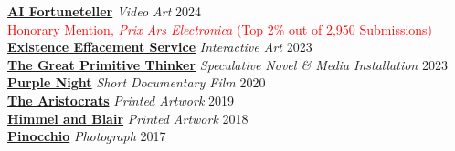 \textbf{\href{https://www.youtube.com/watch?v=Y21DGAZQWMU}{AI Fortuneteller}} \textit{Video Art} \hfill{2024}\\
\textcolor{red}{Honorary Mention, \textit{Prix Ars Electronica} (Top 2\% out of 2,950 Submissions)} \\
\textbf{\href{https://www.kwonsoonho.com/project/existenceeffacement}{Existence Effacement Service}} \textit{Interactive Art} \hfill{2023}\\
\textbf{\href{https://www.kwonsoonho.com/project/thegpt}{The Great Primitive Thinker}} \textit{Speculative Novel \& Media Installation} \hfill{2023}\\
\textbf{\href{https://www.youtube.com/watch?v=L7FiZeaj5Xc}{Purple Night}} \textit{Short Documentary Film} \hfill{2020}\\
\textbf{\href{https://www.kwonsoonho.com/project/aristocrats}{The Aristocrats}} \textit{Printed Artwork} \hfill{2019}\\
\textbf{\href{https://www.kwonsoonho.com/project/copy-of-aristocrats}{Himmel and Blair}} \textit{Printed Artwork} \hfill{2018}\\
\textbf{\href{https://www.kwonsoonho.com/project/pinocchio}{Pinocchio}} \textit{Photograph} \hfill{2017}\\

